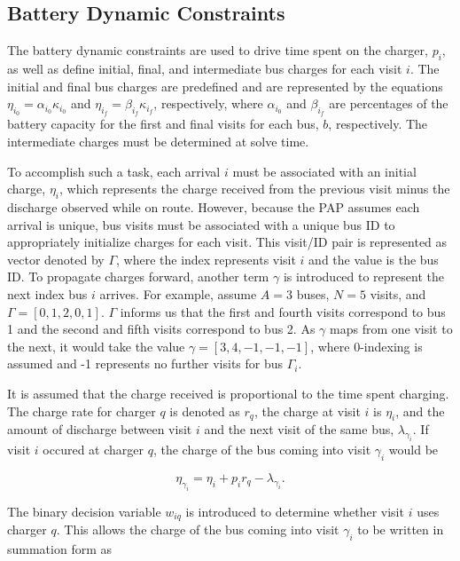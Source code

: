 \documentclass[letterpaper, 10pt, conference]{IEEEtran}
\begin{document}
\subsection{Battery Dynamic Constraints}
The battery dynamic constraints are used to drive time spent on the charger, $p_i$, as well as define initial, final,
and intermediate bus charges for each visit $i$. The initial and final bus charges are predefined and are represented by
the equations $\eta_{i_0} = \alpha_{i_0} \kappa_{i_0}$ and $\eta_{i_f} = \beta_{i_f} \kappa_{i_f}$, respectively, where $\alpha_{i_0}$ and $\beta_{i_f}$
are percentages of the battery capacity for the first and final visits for each bus, $b$, respectively. The intermediate
charges must be determined at solve time.

To accomplish such a task, each arrival $i$ must be associated with an initial charge, $\eta_i$, which represents the
charge received from the previous visit minus the discharge observed while on route. However, because the PAP assumes
each arrival is unique, bus visits must be associated with a unique bus ID to appropriately initialize charges for each
visit. This visit/ID pair is represented as vector denoted by $\Gamma$, where the index represents visit $i$ and the value is
the bus ID. To propagate charges forward, another term $\gamma$ is introduced to represent the next index bus $i$ arrives.
For example, assume $A = 3$ buses, $N = 5$ visits, and $\Gamma = [0,1,2,0,1]$. $\Gamma$ informs us that the first and fourth
visits correspond to bus 1 and the second and fifth visits correspond to bus 2. As $\gamma$ maps from one visit to the next,
it would take the value $\gamma = [3,4,-1,-1,-1]$, where 0-indexing is assumed and -1 represents no further visits for bus
$\Gamma_i$.

It is assumed that the charge received is proportional to the time spent charging. The charge rate for charger $q$ is
denoted as $r_q$, the charge at visit $i$ is $\eta_i$, and the amount of discharge between visit $i$ and the next visit of
the same bus, $\lambda_{\gamma_i}$. If visit $i$ occured at charger $q$, the charge of the bus coming into visit $\gamma_i$ would be

\begin{equation}
	\eta_{\gamma_i} = \eta_i + p_i r_q - \lambda_{\gamma_i}.
\end{equation}

The binary decision variable $w_{iq}$ is introduced to determine whether visit $i$ uses charger $q$. This allows the
charge of the bus coming into visit $\gamma_i$ to be written in summation form as
\end{document}
